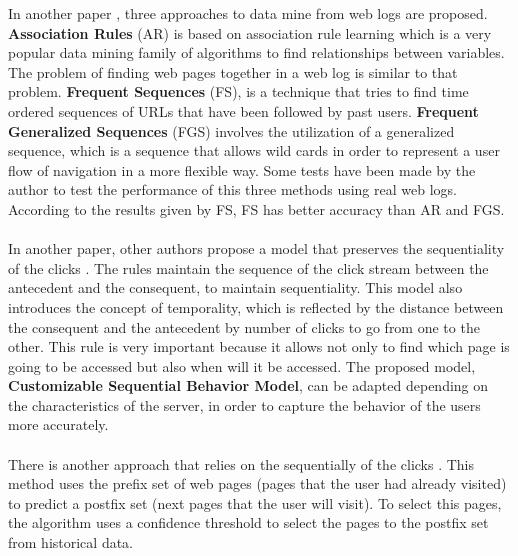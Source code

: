 In another paper \cite{Gery:2003:EWU:956699.956716}, three approaches to data
mine from web logs are proposed. \textbf{Association Rules} (AR) is based on
association rule learning which is a very popular data mining family of
algorithms to find relationships between variables. The problem of finding web
pages together in a web log is similar to that problem. \textbf{Frequent
Sequences} (FS), is a technique that tries to find time ordered sequences of
URLs that have been followed by past users. \textbf{Frequent Generalized
Sequences} (FGS) involves the utilization of a generalized sequence, which is a
sequence that allows wild cards in order to represent a user flow of navigation
in a more flexible way. Some tests have been made by the author
\cite{Gery:2003:EWU:956699.956716} to test the performance of this three methods
using real web logs. According to the results given by FS, FS has better
accuracy than AR and FGS.

\paragraph{}

In another paper, other authors propose a model that preserves the sequentiality of
the clicks \cite{Frias-Martinez2003}. The rules maintain the sequence of the
click stream between the antecedent and the consequent, to maintain
sequentiality. This model also introduces the concept of temporality, which is
reflected by the distance between the consequent and the antecedent by number of
clicks to go from one to the other. This rule is very important because it
allows not only to find which page is  going to be accessed but also when will
it be accessed. The proposed model, \textbf{Customizable Sequential Behavior
Model}, can be adapted depending on the characteristics of the server, in order
to capture the behavior of the users more accurately.

\paragraph{}

There is another approach that relies on the sequentially of the clicks
\cite{Jan:2007:WUB:1353862.1353874}. This method uses the prefix set of web
pages (pages that the user had already visited) to predict a postfix set (next
pages that the user will visit). To select this pages, the algorithm uses a
confidence threshold to select the pages to the postfix set from historical
data.


